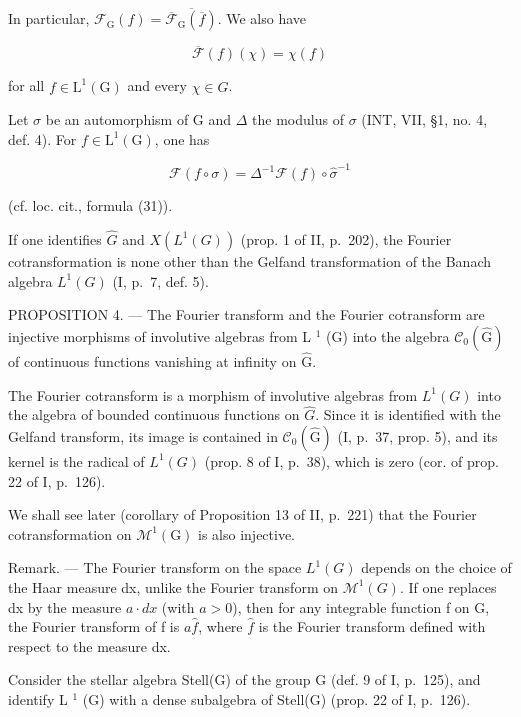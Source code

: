 In particular, \(\mathcal{F}_{\mathrm{G}}(f) = \overline{\overline{\mathcal{F}}_{\mathrm{G}}(\overline{f})}\). We also have

\[
\overline {{\mathcal {F}}} (f) (\chi) = \chi (f)\tag{15}
\]

for all \(f \in \mathrm{L}^{1}(\mathrm{G})\) and every \(\chi \in \widehat{G}\).

Let \(\sigma\) be an automorphism of G and \(\Delta\) the modulus of \(\sigma\) (INT, VII, §1, no. 4, def. 4). For \(f \in \mathrm{L}^1(\mathrm{G})\), one has

\[
\mathcal {F} (f \circ \sigma) = \Delta^ {- 1} \mathcal {F} (f) \circ \widehat {\sigma} ^ {- 1}\tag{16}
\]

(cf. loc. cit., formula (31)).

If one identifies \(\widehat{G}\) and \(X(L^{1}(G))\) (prop. 1 of II, p.~202), the Fourier cotransformation is none other than the Gelfand transformation of the Banach algebra \(L^{1}(G)\) (I, p.~7, def. 5).

PROPOSITION 4. --- The Fourier transform and the Fourier cotransform are injective morphisms of involutive algebras from L \(^{1}\) (G) into the algebra \(\mathcal{C}_{0}(\widehat{\mathrm{G}})\) of continuous functions vanishing at infinity on \(\widehat{\mathrm{G}}\).

The Fourier cotransform is a morphism of involutive algebras from \(L^{1}(G)\) into the algebra of bounded continuous functions on \(\widehat{G}\). Since it is identified with the Gelfand transform, its image is contained in \(\mathcal{C}_{0}(\widehat{\mathrm{G}})\) (I, p.~37, prop. 5), and its kernel is the radical of \(L^{1}(G)\) (prop. 8 of I, p.~38), which is zero (cor. of prop. 22 of I, p.~126).

We shall see later (corollary of Proposition 13 of II, p.~221) that the Fourier cotransformation on \(\mathcal{M}^{1}(\mathrm{G})\) is also injective.

Remark. --- The Fourier transform on the space \(L^{1}(G)\) depends on the choice of the Haar measure dx, unlike the Fourier transform on \(\mathcal{M}^{1}(G)\). If one replaces dx by the measure \(a \cdot dx\) (with \(a > 0\)), then for any integrable function f on G, the Fourier transform of f is \(a\widehat{f}\), where \(\widehat{f}\) is the Fourier transform defined with respect to the measure dx.

Consider the stellar algebra Stell(G) of the group G (def. 9 of I, p.~125), and identify L \(^{1}\) (G) with a dense subalgebra of Stell(G) (prop. 22 of I, p.~126).

